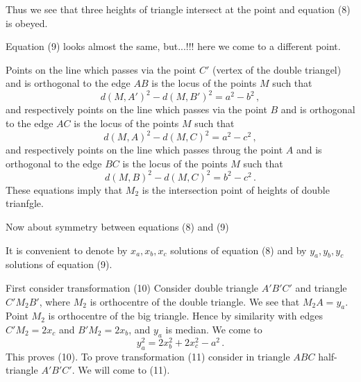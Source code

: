 Thus we see that three heights of triangle intersect 
at the point and equation (8) is obeyed.

Equation (9) looks almost the same, but...!!!
here we come to a different point.

  Points  on the line  which passes via the
point $C'$ (vertex of the double triangel)
and is orthogonal to the edge $AB$
is the locus of the points $M$ such that
         $$
	d(M,A')^2-d(M,B')^2=a^2-b^2\,,
	 $$
and respectively points on the line  which passes via the point $B$
and is orthogonal 
to the edge $AC$
is the locus of the points $M$ such that
         $$
	d(M,A)^2-d(M,C)^2=a^2-c^2\,,
	 $$
and respectively
points on the line  which passes throug the point
$A$ and is orthogonal to the edge $BC$
is the locus of the points $M$ such that
         $$
	d(M,B)^2-d(M,C)^2=b^2-c^2\,.
	 $$	 
	 These equations imply that $M_2$
	 is the intersection point of 
	 heights of double trianfgle.
    
    Now about symmetry between equations (8) and (9)
   
It is convenient to denote by $x_a,x_b,x_c$ solutions of equation
(8) and by $y_a,y_b,y_c$
solutions of equation (9).

First consider transformation (10)
Consider double triangle $A'B'C'$
and triangle $C'M_2B'$, where $M_2$ is orthocentre of the double triangle.
We see that $M_2A=y_a$. Point $M_2$ is orthocentre of the big triangle.
Hence by similarity
with edges $C'M_2=2x_c$ and $B'M_2=2x_b$, and  $y_a$ is median.
We come to
       $$
      y_a^2=2x_b^2+2x_c^2-a^2\,. 
       $$
       This proves (10). To prove transformation
       (11) consider in triangle $ABC$  half-triangle
       $A'B'C'$. We will come to (11).
    \bye

